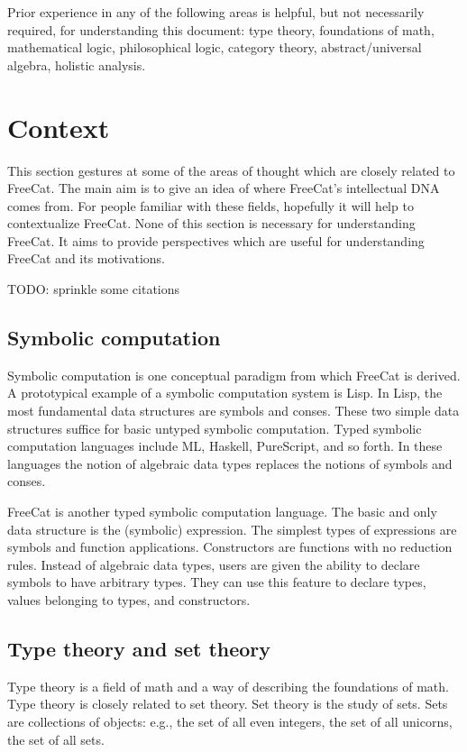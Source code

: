 \documentclass{article}
\begin{document}
Prior experience in any of the following areas is helpful, but not necessarily required, for understanding this document: type theory, foundations of math, mathematical logic, philosophical logic, category theory, abstract/universal algebra, holistic analysis.

\section{Context}

This section gestures at some of the areas of thought which are closely related to FreeCat. The main aim is to give an idea of where FreeCat's intellectual DNA comes from. For people familiar with these fields, hopefully it will help to contextualize FreeCat. None of this section is necessary for understanding FreeCat. It aims to provide perspectives which are useful for understanding FreeCat and its motivations.

TODO: sprinkle some citations

\subsection{Symbolic computation}

Symbolic computation is one conceptual paradigm from which FreeCat is derived. A prototypical example of a symbolic computation system is Lisp. In Lisp, the most fundamental data structures are symbols and conses. These two simple data structures suffice for basic untyped symbolic computation. Typed symbolic computation languages include ML, Haskell, PureScript, and so forth. In these languages the notion of algebraic data types replaces the notions of symbols and conses.

FreeCat is another typed symbolic computation language. The basic and only data structure is the (symbolic) expression. The simplest types of expressions are symbols and function applications. Constructors are functions with no reduction rules. Instead of algebraic data types, users are given the ability to declare symbols to have arbitrary types. They can use this feature to declare types, values belonging to types, and constructors.

\subsection{Type theory and set theory}

Type theory is a field of math and a way of describing the foundations of math. Type theory is closely related to set theory. Set theory is the study of sets. Sets are collections of objects: e.g., the set of all even integers, the set of all unicorns, the set of all sets.
\end{document}
